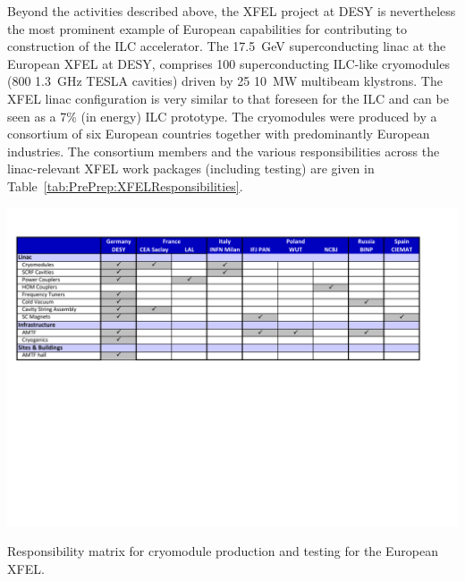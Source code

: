 \documentclass[%
 reprint,
 amsmath,amssymb,
 aps,
]{revtex4-1}
\begin{document}
\vspace{0.15cm}
Beyond the activities described above, the XFEL project at DESY is nevertheless the most prominent example of European capabilities for contributing to construction of the ILC accelerator.
The 17.5~GeV superconducting linac at the European XFEL at DESY, comprises 100 superconducting ILC-like cryomodules (800 1.3~GHz TESLA cavities) driven by 25 10~MW multibeam klystrons. The XFEL linac configuration is very similar to that foreseen for the ILC and can be seen as a 7\% (in energy) ILC prototype. The cryomodules were produced by a consortium of six European countries together with predominantly European industries. The consortium members and the various responsibilities across the linac-relevant XFEL work packages (including testing) are given in Table~\ref{tab:PrePrep:XFELResponsibilities}.

\begin{table}[t]
\includegraphics[width=\textwidth]{figures/ILCEAP-Matrices-XFEL.pdf}
\caption{\label{tab:PrePrep:XFELResponsibilities} Responsibility matrix for cryomodule production and testing for the European XFEL.} 
\end{table}
\end{document}
